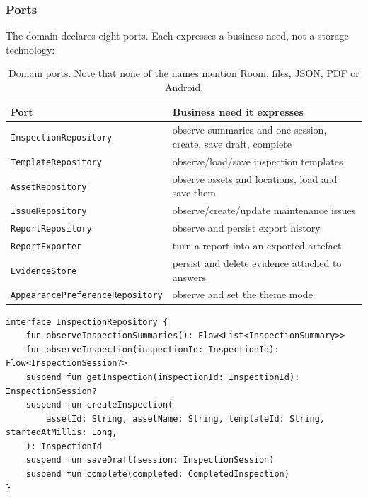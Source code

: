 \documentclass[11pt,a4paper]{article}
\newcommand{\file}[1]{{\small\texttt{#1}}}
\begin{document}
\subsubsection{Ports}

The domain declares eight ports. Each expresses a business need, not a storage
technology:

\begin{table}[H]
\centering
\small
\begin{tabularx}{\linewidth}{@{}l X@{}}
\toprule
\textbf{Port} & \textbf{Business need it expresses} \\
\midrule
\file{InspectionRepository}          & observe summaries and one session, create, save draft, complete \\
\file{TemplateRepository}            & observe/load/save inspection templates \\
\file{AssetRepository}               & observe assets and locations, load and save them \\
\file{IssueRepository}               & observe/create/update maintenance issues \\
\file{ReportRepository}              & observe and persist export history \\
\file{ReportExporter}                & turn a report into an exported artefact \\
\file{EvidenceStore}                 & persist and delete evidence attached to answers \\
\file{AppearancePreferenceRepository}& observe and set the theme mode \\
\bottomrule
\end{tabularx}
\caption{Domain ports. Note that none of the names mention Room, files, JSON, PDF or Android.}
\end{table}

\begin{lstlisting}[caption={\file{domain/.../repository/InspectionRepository.kt}
--- the port. \texttt{Flow} is the only framework type it mentions.}]
interface InspectionRepository {
    fun observeInspectionSummaries(): Flow<List<InspectionSummary>>
    fun observeInspection(inspectionId: InspectionId): Flow<InspectionSession?>
    suspend fun getInspection(inspectionId: InspectionId): InspectionSession?
    suspend fun createInspection(
        assetId: String, assetName: String, templateId: String, startedAtMillis: Long,
    ): InspectionId
    suspend fun saveDraft(session: InspectionSession)
    suspend fun complete(completed: CompletedInspection)
}
\end{lstlisting}
\end{document}
